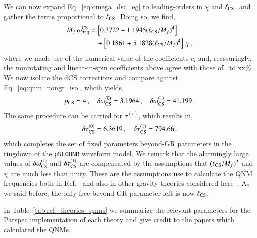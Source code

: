 \documentclass[twocolumn,
               prd,
               aps,
               superscriptaddress,
               tightenlines,
               nofootinbib,
               eqsecnum,
               amsfonts,
               amsmath,
               longbibliography]{revtex4-1}
\newcommand{\Mf}{M_f}
\newcommand{\pSEOB}{\texttt{pSEOBNR}}
\begin{document}
We can now expand Eq.~\eqref{eq:omega_dsc_eg} to leading-orders in $\chi$ and $\ell_{\rm CS}$, and
gather the terms proportional to $\ell_{\rm CS}$.
%
Doing so, we find,
%
\begin{align}
    \Mf \, \omega^{\rm CS}_{220} &=
    \left[ 0.3722 + 1.1945 (\ell_{\rm CS} / \Mf)^4 \right]
    \nonumber \\
    &\quad + \left[0.1861 + 5.1828 (\ell_{\rm CS} / \Mf)^4 \right] \, \chi\,,
\end{align}
%
where we made use of the numerical value of the coefficients $c_{i}$ and,
reassuringly, the nonrotating and linear-in-spin coefficients above agree with those
of~\cite{Maselli:2019mjd} to xx\%.
%
We now isolate the dCS corrections and compare against Eq.~\eqref{eq:qnm_nongr_iso},
whcih yields,
%
\begin{equation}
p_{\rm CS} = 4\,, \quad \delta \omega^{(0)}_{\rm CS} = 3.1964\,, \quad \delta \omega^{(1)}_{\rm CS} = 41.199\,.
\label{eq:cs_omega_coefs}
\end{equation}
%
The same procedure can be carried for $\tau^{(i)}$, which results in,
%
\begin{equation}
\delta \tau^{(0)}_{\rm CS} = 6.3619\,, \quad \delta \tau^{(1)}_{\rm CS} = 794.66\,.
\label{eq:cs_tau_coefs}
\end{equation}
%
which completes the set of fixed parameters beyond-GR parameters in the ringdown of the \pSEOB{} waveform model.
%
We remark that the alarmingly large values of $\delta \omega_{\rm CS}^{(1)}$ and $\delta \tau_{\rm CS}^{(1)}$
are compensated by the assumptions that $(\ell_{\rm CS} / M_f)^2$ and $\chi$ are much less than unity. These
are the assumptions use to calculate the QNM frequencies both in Ref.~\cite{Wagle:2021tam} and also in
other gravity theories considered here~\cite{Pierini:2021jxd,Cano:2021myl}.
%
As we said before, the only free beyond-GR parameter left is now $\ell_{\rm CS}$.

In Table~\ref{tab:ref_theories_qnms} we summarize the relevant parameters for
the {\sc Parspec} implementation of each theory and give credit to the papers
which calculated the QNMs.
\end{document}
